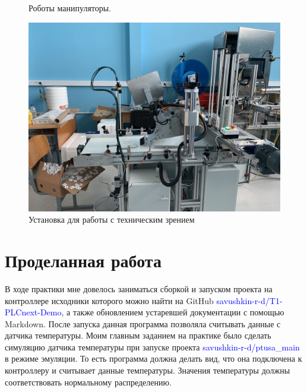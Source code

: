 \begin{figure}[ht]
\hspace*{\fill}%
	\caption{Роботы манипуляторы. }
	\label{fig:robot}
 
\end{figure}
 \hfill


 \begin{figure}[ht]
 \centering
		\includegraphics[height =10 cm, keepaspectratio]{images/техзрение.jpg}
		\caption{ Установка для работы с техническим зрением}
		\label{fig:техзрение}
	\end{figure}

\section{ Проделанная работа }

В ходе практики мне довелось заниматься сборкой и запуском проекта на контроллере исходники которого можно найти на GitHub \textcolor{blue}{savushkin-r-d/T1-PLCnext-Demo}, а также обновлением устаревшей документации с помощью Markdown. После запуска данная программа позволяла считывать данные с датчика температуры.
Моим главным заданием на практике было сделать симуляцию датчика температуры при запуске проекта  \textcolor{blue}{savushkin-r-d/ptusa\_main} в режиме эмуляции. То есть программа должна делать вид, что она подключена к контроллеру и считывает данные температуры. Значения температуры должны соответствовать нормальному распределению.

